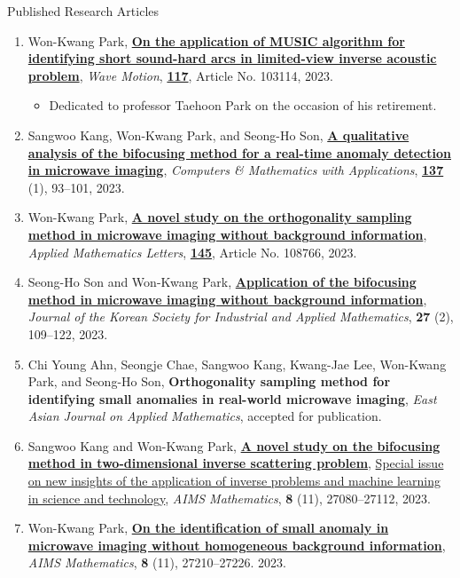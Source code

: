 \documentclass{resume} %
\begin{document}
\begin{rSection}{Published Research Articles}
\begin{enumerate}
\item\label{A-WAMOT2023} Won-Kwang Park, \href{https://doi.org/10.1016/j.wavemoti.2022.103114}{\textbf{On the application of MUSIC algorithm for identifying short sound-hard arcs in limited-view inverse acoustic problem}}, \textit{Wave Motion}, \href{https://www.sciencedirect.com/journal/wave-motion/vol/117/suppl/C}{\textbf{117}}, Article No. 103114, 2023.
\begin{itemize}
\item Dedicated to professor Taehoon Park on the occasion of his retirement.
\end{itemize}
\item\label{A-CAMWA2023} Sangwoo Kang, Won-Kwang Park, and Seong-Ho Son, \href{https://doi.org/10.1016/j.camwa.2023.02.017}{\textbf{A qualitative analysis of the bifocusing method for a real-time anomaly detection in microwave imaging}}, \textit{Computers \& Mathematics with Applications}, \href{https://www.sciencedirect.com/journal/computers-and-mathematics-with-applications/vol/137/suppl/C}{\textbf{137}} (1), 93--101, 2023.
\item\label{A-AML2023} Won-Kwang Park, \href{https://doi.org/10.1016/j.aml.2023.108766}{\textbf{A novel study on the orthogonality sampling method in microwave imaging without background information}}, \textit{Applied Mathematics Letters}, \href{https://www.sciencedirect.com/journal/applied-mathematics-letters/vol/145/suppl/C}{\textbf{145}}, Article No. 108766, 2023.
\item\label{A-KSIAM2023} Seong-Ho Son and Won-Kwang Park, \href{https://doi.org/10.12941/jksiam.2023.27.109}{\textbf{Application of the bifocusing method in microwave imaging without background information}}, \textit{Journal of the Korean Society for Industrial and Applied Mathematics}, \textbf{27} (2), 109--122, 2023.
\item\label{A-EAJAM2023} Chi Young Ahn, Seongje Chae, Sangwoo Kang, Kwang-Jae Lee, Won-Kwang Park, and Seong-Ho Son, \textbf{Orthogonality sampling method for identifying small anomalies in real-world microwave imaging}, \textit{East Asian Journal on Applied Mathematics}, accepted for publication.
\item\label{A-AIMS2023A} Sangwoo Kang and Won-Kwang Park, \href{https://doi.org/10.3934/math.20231386}{\textbf{A novel study on the bifocusing method in two-dimensional inverse scattering problem}}, \href{https://www.aimspress.com/math/article/6491/special-articles}{Special issue on new insights of the application of inverse problems and machine learning in science and technology}, \textit{AIMS Mathematics}, \textbf{8} (11), 27080--27112, 2023.
\item\label{A-AIMS2023B} Won-Kwang Park, \href{https://doi.org/10.3934/math.20231392}{\textbf{On the identification of small anomaly in microwave imaging without homogeneous background information}}, \textit{AIMS Mathematics}, \textbf{8} (11), 27210--27226. 2023.
\end{enumerate}
\end{rSection}
\end{document}
